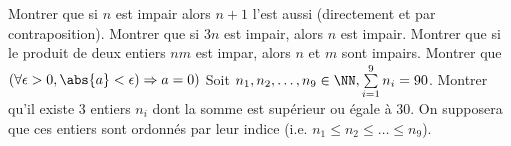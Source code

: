 %
%
		\begin{tasks}
			\task Montrer que si $n$ est impair alors $n+1$ l'est aussi (directement et par contraposition).
			\task Montrer que si $3n$ est impair, alors $n$ est impair.
			\task Montrer que si le produit de deux entiers $nm$ est impar, alors $n$ et $m$ sont impairs.
			\task Montrer que $(\forall \epsilon > 0, \abs{a} < \epsilon) \Rightarrow a=0 )$
			\task Soit $n_1, n_2, \dots, n_9 \in \NN, \sum\limits_{i=1}^9 n_i =90$. Montrer qu'il existe 3 entiers $n_i$ dont la somme est supérieur ou égale à 30. On supposera que ces entiers sont ordonnés par leur indice (i.e. $n_1 \le n_2 \le \dots \le n_9$).
		\end{tasks}
